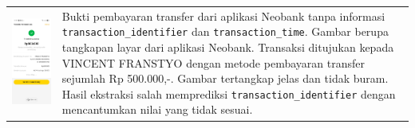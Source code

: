 \begin{table}[h!]
\begin{tabularx}{\textwidth}{m{} X}
        \includegraphics[width=\linewidth]{images/contoh-data/tf-4.jpg}
        & 
        Bukti pembayaran transfer dari aplikasi Neobank tanpa informasi \texttt{transaction\_identifier} dan \texttt{transaction\_time}. Gambar berupa tangkapan layar dari aplikasi Neobank. Transaksi ditujukan kepada VINCENT FRANSTYO dengan metode pembayaran transfer sejumlah Rp 500.000,-. Gambar tertangkap jelas dan tidak buram. Hasil ekstraksi salah memprediksi \texttt{transaction\_identifier} dengan mencantumkan nilai yang tidak sesuai. \\
    \end{tabularx}
\end{table}

